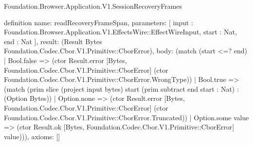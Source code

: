 \begin{lexlean}{Foundation.Browser.Application.V1.SessionRecoveryFrames}
\begin{semanticmodule}
definition{
  name: readRecoveryFrameSpan,
  parameters: [
    input : Foundation.Browser.Application.V1.EffectsWire::EffectWireInput,
    start : Nat,
    end : Nat
  ],
  result: (Result Bytes Foundation.Codec.Cbor.V1.Primitive::CborError),
  body: (match (start <=? end)
    | Bool.false => (ctor Result.error [Bytes, Foundation.Codec.Cbor.V1.Primitive::CborError] (ctor Foundation.Codec.Cbor.V1.Primitive::CborError.WrongType))
    | Bool.true => (match (prim slice (project input bytes) start (prim subtract end start : Nat) : (Option Bytes))
      | Option.none => (ctor Result.error [Bytes, Foundation.Codec.Cbor.V1.Primitive::CborError] (ctor Foundation.Codec.Cbor.V1.Primitive::CborError.Truncated))
      | Option.some value => (ctor Result.ok [Bytes, Foundation.Codec.Cbor.V1.Primitive::CborError] value))),
  axioms: []
}


\end{semanticmodule}
\end{lexlean}
